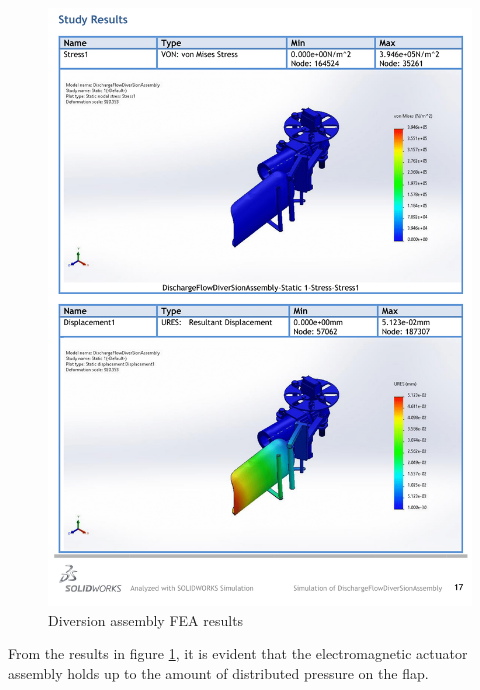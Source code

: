 \begin{enumerate}
\begin{figure}[H]
        \includegraphics[height=\textheight, width=\textwidth]{Figures/DischargeFlowDiverSionAssembly-Static 1-1-1.png}
        \caption{Diversion assembly FEA results}
        \label{fig:e_simulation_results}
    \end{figure}
    From the results in figure \ref{fig:e_simulation_results}, it is evident that the electromagnetic actuator assembly holds up to the amount of distributed pressure on the flap. 
\end{enumerate}
